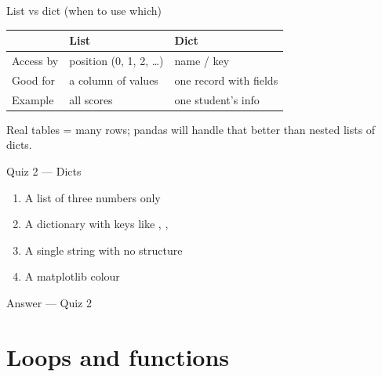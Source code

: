 \documentclass[aspectratio=169,11pt]{beamer}
\begin{document}
    \begin{frame}{List vs dict (when to use which)}
        \begin{center}
            \begin{tabular}{@{}lll@{}}
                \toprule
                & \textbf{List} & \textbf{Dict} \\
                \midrule
                Access by & position (0, 1, 2, \ldots) & name / key \\
                Good for & a column of values & one record with fields \\
                Example & all scores & one student's info \\
                \bottomrule
            \end{tabular}
        \end{center}
        \vspace{0.5em}
        Real tables = many rows; pandas will handle that better than nested lists of dicts.
    \end{frame}

    \begin{frame}{Quiz 2 --- Dicts}
        \begin{enumerate}
            \item A list of three numbers only
            \item A dictionary with keys like , , 
            \item A single string with no structure
            \item A matplotlib colour
        \end{enumerate}
        \quizpause
    \end{frame}

    \begin{frame}{Answer --- Quiz 2}
    \end{frame}

    \section{Loops and functions}
\end{document}
